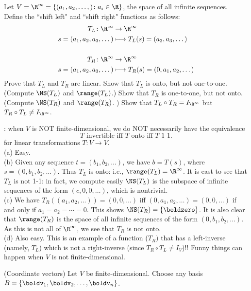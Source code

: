 \begin{samepage}
\ii Let $V=\R^\infty=\{(a_1,a_2,\dots, )\colon a_i\in\R\}$, the space of all infinite sequences. Define the ``shift left" and ``shift right" functions as follows:
\begin{align*}
T_L\colon \R^\infty&\rightarrow \R^\infty\\
s=(a_1,a_2, a_3,\dots )&\longmapsto T_L(s)=(a_2, a_3,\dots) \\
\\
T_R\colon \R^\infty&\rightarrow \R^\infty\\
s=(a_1,a_2, a_3,\dots )&\longmapsto T_R(s)=(0,a_1,a_2,\dots) 
\end{align*}
\bb
\ii Prove that $T_L$ and $T_R$ are linear. 
\ii Show that $T_L$ is onto, but not one-to-one. (Compute $\NS(T_L)$ and $\range(T_L)$.)
\ii Show that $T_R$ is one-to-one, but not onto. (Compute $\NS(T_R)$ and $\range(T_R)$. )
\ii Show that $T_L\circ T_R=I_{\R^\infty}$ but $T_R\circ T_L\ne I_{\R^\infty}$. 
\ee
\end{samepage}
\begin{solution}
: when $V$ is NOT finite-dimensional, we do NOT necessarily have the equivalence
\[
\text{$T$ invertible iff $T$ onto iff $T$ 1-1}.
\]
for linear transformations $T\colon V\rightarrow V$.  
\\
(a) Easy. 
\\
(b) Given any sequence $t=(b_1,b_2,\dots )$, we have $b=T(s)$, where $s=(0,b_1,b_2,\dots)$. Thus $T_L$ is onto: i.e., $\range(T_L)=\R^\infty$. It is east to see that $T_L$ is not 1-1: in fact, we compute easily $\NS(T_L)$ is the subspace of infinite sequences of the form $(c,0,0,\dots)$, which is nontrivial. 
\\
(c) We have $T_R((a_1,a_2,\dots))=(0,0,\dots)$ iff $(0,a_1,a_2,\dots)=(0,0,\dots)$ if and only if $a_1=a_2=\cdots =0$. This shows $\NS(T_R)=\{\boldzero\}$. It is also clear that $\range(T_R)$ is the space of all infinite sequences of the form $(0,b_1,b_2,\dots)$. As this is not all of $\R^\infty$, we see that $T_R$ is not onto. 
\\
(d) Also easy. This is an example of a function ($T_R)$ that has a left-inverse (namely, $T_L$) which is not a right-inverse (since $T_R\circ T_L\ne I_V$)!! Funny things can happen when $V$ is not finite-dimensional. 
\end{solution}
\ii (Coordinate vectors) Let $V$ be finite-dimensional. Choose any basis $B=\{\boldv_1,\boldv_2,\dots , \boldv_n\}$.
\\
